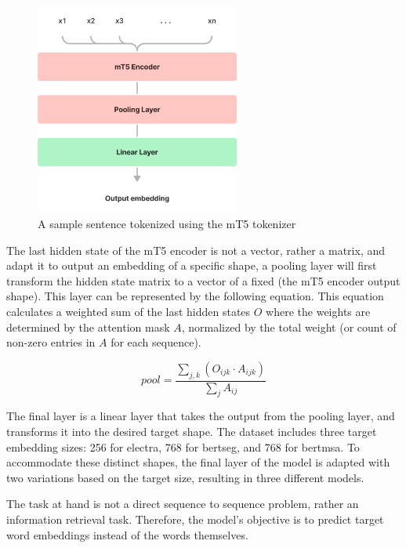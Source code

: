 \documentclass[15pt]{article}
\begin{document}
\begin{figure}[H]
    \centering
    \captionsetup{justification=centering}
    \includegraphics[width=0.6\textwidth]{model-arch.png}
    \caption{A sample sentence tokenized using the mT5 tokenizer}
    \label{fig:model-arch}
\end{figure}

The last hidden state of the mT5 encoder is not a vector, rather a matrix, and adapt it to output an embedding of a specific shape, a pooling layer will first transform the hidden state matrix to a vector of a fixed (the mT5 encoder output shape). This layer can be represented by the following equation. This equation calculates a weighted sum of the last hidden states \(O\) where the weights are determined by the attention mask \(A\), normalized by the total weight (or count of non-zero entries in \(A\) for each sequence).

\begin{equation}
    pool = \frac{\sum_{j,k} (O_{ijk} \cdot A_{ijk})}{\sum_j A_{ij}}
\end{equation}

The final layer is a linear layer that takes the output from the pooling layer, and transforms it into the desired target shape. The dataset includes three target embedding sizes: 256 for electra, 768 for bertseg, and 768 for bertmsa. To accommodate these distinct shapes, the final layer of the model is adapted with two variations based on the target size, resulting in three different models.

The task at hand is not a direct sequence to sequence problem, rather an information retrieval task. Therefore, the model's objective is to predict target word embeddings instead of the words themselves.
\end{document}
